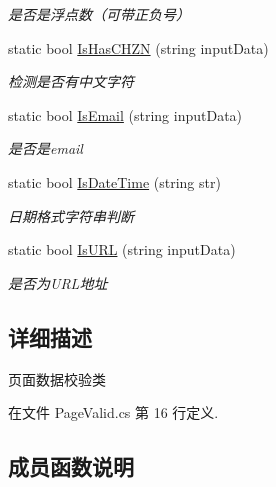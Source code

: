 \begin{DoxyCompactItemize}
\begin{DoxyCompactList}\small\item\em 是否是浮点数（可带正负号） \end{DoxyCompactList}\item 
static bool \hyperlink{class_x_c_l_net_tools_1_1_string_hander_1_1_page_valid_a13211b08f74ed73f0ea6483eb065aeb3}{Is\+Has\+C\+H\+ZN} (string input\+Data)
\begin{DoxyCompactList}\small\item\em 检测是否有中文字符 \end{DoxyCompactList}\item 
static bool \hyperlink{class_x_c_l_net_tools_1_1_string_hander_1_1_page_valid_a937e79914e914c2c820f5c9af0273c6e}{Is\+Email} (string input\+Data)
\begin{DoxyCompactList}\small\item\em 是否是email \end{DoxyCompactList}\item 
static bool \hyperlink{class_x_c_l_net_tools_1_1_string_hander_1_1_page_valid_ad5e0e978f61e949d4d6548fc3509cdea}{Is\+Date\+Time} (string str)
\begin{DoxyCompactList}\small\item\em 日期格式字符串判断 \end{DoxyCompactList}\item 
static bool \hyperlink{class_x_c_l_net_tools_1_1_string_hander_1_1_page_valid_a1b7a8a961ee9d599e74d29301475d69e}{Is\+U\+RL} (string input\+Data)
\begin{DoxyCompactList}\small\item\em 是否为\+U\+R\+L地址 \end{DoxyCompactList}\end{DoxyCompactItemize}


\subsection{详细描述}
页面数据校验类 



在文件 Page\+Valid.\+cs 第 16 行定义.



\subsection{成员函数说明}
